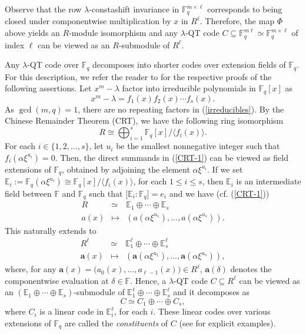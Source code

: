 \documentclass[11pt]{amsart}
\theoremstyle{plain}
\theoremstyle{definition}
\numberwithin{equation}{section}
\newcommand{\Fq}{\mathbb{F}_{q}}
\newcommand{\E}{\mathbb{E}}
\newcommand{\F}{{\mathbb F}}
\begin{document}
Observe that the row $\lambda$-constashift invariance in $\Fq^{m\times\ell}$ corresponds to being closed under componentwise multiplication by $x$ in $R^\ell$. Therefore, the map $\Phi$ above yields an $R$-module isomorphism and any $\lambda$-QT code $C\subseteq \F_q^{m\ell}\simeq \Fq^{m\times\ell}$ of index $\ell$ can be viewed as an $R$-submodule of $R^\ell$.

Any $\lambda$-QT code over $\F_q$ decomposes into shorter codes over extension fields of $\F_q$. For this description, we refer the reader to \cite{Y} for the respective proofs of the following assertions. Let $x^m-\lambda$ factor into irreducible polynomials in $\F_q[x]$ as
\begin{equation}\label{irreducibles}
x^m-\lambda=f_1(x)f_2(x)\cdots f_s(x).
\end{equation}
As $\gcd(m,q)=1$, there are no repeating factors in (\ref{irreducibles}). By the Chinese Remainder Theorem (CRT), we have the following ring isomorphism
\begin{equation} \label{CRT-1}
R\cong \bigoplus_{i=1}^{s} \F_q[x]/\langle f_i(x)\rangle .
\end{equation}
For each $i\in\{1,2,\ldots,s\}$, let $u_i$ be the smallest nonnegative integer such that $f_i(\alpha\xi^{u_i})=0$. Then, the direct summands in (\ref{CRT-1}) can be viewed as field extensions of $\F_q$, obtained by adjoining the element $\alpha\xi^{u_i}$. If we set $\E_i:=\Fq(\alpha\xi^{u_i})\cong \Fq[x]/\langle f_i(x) \rangle$, for each $1\leq i \leq s$, then $\E_i$ is an intermediate field between $\F$ and $\Fq$ such that $\big[\E_i : \F_q\big]=e_i$ and we have (cf. (\ref{CRT-1}))
\begin{eqnarray} \label{CRT-2}
R & \simeq & \E_1 \oplus \cdots \oplus \E_{s}
 \nonumber \\
a(x) & \mapsto & \left(a(\alpha\xi^{u_1}),\ldots ,a(\alpha\xi^{u_s}) \right).
\end{eqnarray}
This naturally extends to
\begin{eqnarray} \label{CRT-3}
R^{\ell}&\simeq & \E_1^{\ell} \oplus \cdots  \oplus \E_{s}^{\ell}
\nonumber \\ 
\mathbf{a}(x) & \mapsto & \left(\mathbf{a}(\alpha\xi^{u_1}),\ldots ,\mathbf{a}(\alpha\xi^{u_s}) \right),
\end{eqnarray}
where, for any $\mathbf{a}(x)=\bigl(a_{0}(x),\ldots ,a_{\ell-1}(x)\bigr)\in R^{\ell}$, $\mathbf{a}(\delta)$ denotes the componentwise evaluation at $\delta\in\F$. Hence, a $\lambda$-QT code $C\subseteq R^\ell$ can be viewed as an $(\E_1 \oplus \cdots \oplus \E_{s})$-submodule of $\E_1^{\ell} \oplus \cdots  \oplus \E_{s}^{\ell}$ and it decomposes as
\begin{equation} \label{constituents}
C \simeq C_1\oplus \cdots  \oplus C_{s},
\end{equation}
where $C_i$ is a linear code in $\E_i^{\ell}$, for each $i$. These linear codes over various extensions of $\F_q$ are called the {\it constituents} of $C$ (see \cite[\S 7]{Y} for explicit examples).
\end{document}
